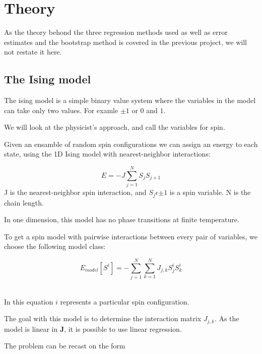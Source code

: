 \section{Theory}


As the theory behond the three regression methods used as well as error 
estimates and the bootstrap method is covered in the previous 
project, we will not restate it here.

\subsection{The Ising model}\label{seq:isingtheory}
The ising model is a simple binary value system where the variables
in the model can take only two values. For examle \(\pm 1\) or \(0\) and \(1\). 
~\cite{Project2} 

We will look at the physicist's approach, and call the variables for spin.
~\cite{Project2}

Given an ensamble of random spin configurations we can assign an energy to
each state, using the 1D Ising model with nearest-neighbor interactions: 

\begin{equation}
	E = -J\sum\limits_{j=1}^N S_jS_{j+1} 
\end{equation}
J is the nearest-neighbor spin interaction, and \(S_j \epsilon {\pm 1}\) is a 
spin variable. N is the chain length. 
~\cite{HighBias}~\cite{Project2} 

In one dimension, this model has no phase transitions at finite temperature.
~\cite{Project2} 

To get a spin model with pairwise interactions between every pair of variables,
we choose the following model class: 

\begin{equation}
	E_{model}[S^i] = -\sum\limits_{j=1}^N\sum\limits_{k=1}^N J_{j,k} S_j^iS_{k}^i
\end{equation}
~\cite{HighBias} 

In this equation \(i\) represents a particular spin configuration. ~\cite{Project2}

The goal with this model is to determine the interaction matrix \(J_{j,k}\). 
As the model is linear in \(\mathbf{J}\), it is possible to use
linear regression.  

The problem can be recast on the form

